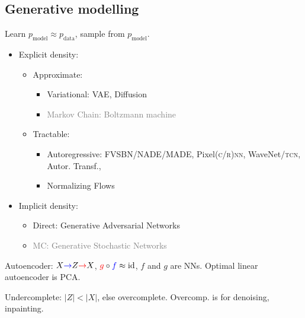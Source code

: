 \documentclass[11pt,landscape,a4paper,fleqn]{article}
\begin{document}
	

\setlength{\columnseprule}{0.1pt}
\begin{multicols*}{4}
    
\section{Generative modelling}

Learn $p_{\mathrm{model}} \approx p_{\mathrm{data}}$, sample from $p_{\mathrm{model}}$.

\begin{itemize}[leftmargin=0.5em]
    \item Explicit density:
    \begin{itemize}[leftmargin=0.3em]
        \item Approximate:
        \begin{itemize}[leftmargin=0.0em]
            \item Variational: VAE, Diffusion
            \item \textcolor{gray}{Markov Chain: Boltzmann machine}
        \end{itemize}
        \item Tractable:
        \begin{itemize}[leftmargin=0.0em]
            \item Autoregressive: FVSBN/NADE/MADE, Pixel\textsc{(c/r)nn}, WaveNet/\textsc{tcn}, Autor. Transf., 
            \item Normalizing Flows
        \end{itemize}
    \end{itemize}
    \item Implicit density:
    \begin{itemize}[leftmargin=0.3em]
        \item Direct: Generative Adversarial Networks
        \item \textcolor{gray}{MC: Generative Stochastic Networks}
    \end{itemize}
\end{itemize}

Autoencoder: $X \textcolor{blue}{\to} Z \textcolor{red}{\to} X$, $\textcolor{red}{g} \circ \textcolor{blue}{f} \approx \mathrm{id}$,
$f$ and $g$ are NNs. Optimal linear autoencoder is PCA.

Undercomplete: $|Z| < |X|$, else overcomplete.
Overcomp. is for denoising, inpainting.


\end{multicols*}
\end{document}
